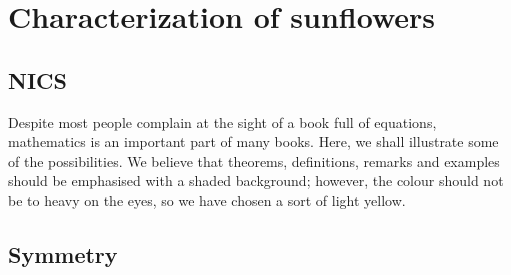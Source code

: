 \setchapterpreamble[u]{\margintoc}
\chapter{Characterization of sunflowers}

\section{NICS}

Despite most people complain at the sight of a book full of equations,
mathematics is an important part of many books. Here, we shall
illustrate some of the possibilities. We believe that theorems,
definitions, remarks and examples should be emphasised with a shaded
background; however, the colour should not be to heavy on the eyes, so
we have chosen a sort of light yellow.

\section{Symmetry}

\blindtext
